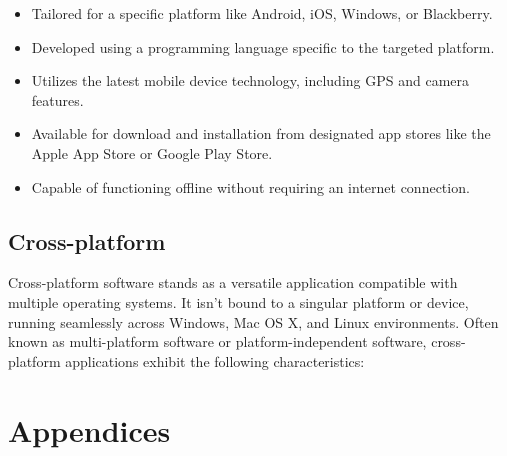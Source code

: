 \documentclass[12pt,a4paper, twosite]{article}
\begin{document}
\begin{itemize}
  \item Tailored for a specific platform like Android, iOS, Windows, or Blackberry.
  \item Developed using a programming language specific to the targeted platform.
  \item Utilizes the latest mobile device technology, including GPS and camera features.
  \item Available for download and installation from designated app stores like the Apple App Store or Google Play Store.
  \item Capable of functioning offline without requiring an internet connection.
\end{itemize}

\subsection{Cross-platform}
\label{sec:orgb8b6b9d}
Cross-platform software stands as a 
versatile application compatible with 
multiple operating systems. It isn't bound 
to a singular platform or device, running 
seamlessly across Windows, Mac OS X, and Linux 
environments. Often known as multi-platform software 
or platform-independent software, cross-platform applications 
exhibit the following characteristics:

\newpage


\section{Appendices}
\label{sec:org75cea03}
\end{document}
